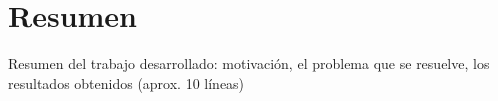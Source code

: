 \section{Resumen}

Resumen del trabajo desarrollado: motivación, el problema que se resuelve, los resultados obtenidos (aprox. 10 líneas)